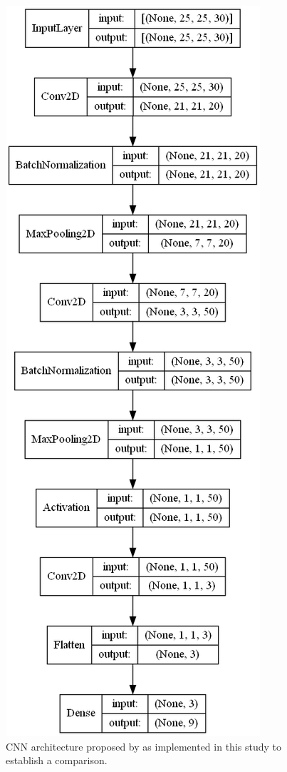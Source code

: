 \begin{figure}[bp]
    \centering
    \includegraphics[width=\linewidth]{figs/vineyard_classification/networks/nezami_25x24_20.png}
	\caption{CNN architecture proposed by \cite{nezami_tree_2020} as implemented in this study to establish a comparison. }
	\label{fig:nezami_cnn}
\end{figure}

